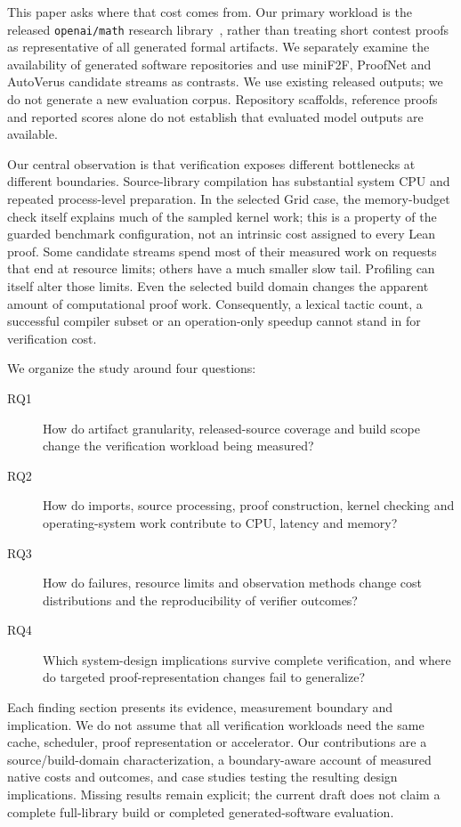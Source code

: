 \documentclass[10pt,twocolumn]{article}
\begin{document}
This paper asks where that cost comes from.
Our primary workload is the released \texttt{openai/math} research
library~\cite{openaiMathSource}, rather than treating short contest proofs as
representative of all generated formal artifacts.
We separately examine the availability of generated software repositories
and use miniF2F, ProofNet and AutoVerus candidate streams as contrasts.
We use existing released outputs; we do not generate a new evaluation corpus.
Repository scaffolds, reference proofs and reported scores alone do not
establish that evaluated model outputs are available.

Our central observation is that verification exposes different bottlenecks
at different boundaries. Source-library compilation has substantial system
CPU and repeated process-level preparation. In the selected Grid case,
the memory-budget check itself explains much of the sampled kernel work;
this is a property of the guarded benchmark configuration, not an intrinsic
cost assigned to every Lean proof. Some candidate streams spend
most of their measured work on requests that end at resource limits; others
have a much smaller slow tail. Profiling can itself alter those limits.
Even the selected build domain changes the apparent amount of computational
proof work. Consequently, a lexical tactic count, a successful compiler
subset or an operation-only speedup cannot stand in for verification cost.

We organize the study around four questions:
\begin{description}
\item[RQ1] How do artifact granularity, released-source coverage and build
scope change the verification workload being measured?
\item[RQ2] How do imports, source processing, proof construction, kernel
checking and operating-system work contribute to CPU, latency and memory?
\item[RQ3] How do failures, resource limits and observation methods change
cost distributions and the reproducibility of verifier outcomes?
\item[RQ4] Which system-design implications survive complete verification,
and where do targeted proof-representation changes fail to generalize?
\end{description}

Each finding section presents its evidence, measurement boundary and
implication. We do not assume that all verification workloads need the same
cache, scheduler, proof representation or accelerator.
Our contributions are a source/build-domain characterization, a
boundary-aware account of measured native costs and outcomes, and
case studies testing the resulting design implications.
Missing results remain explicit; the current draft does not claim a
complete full-library build or completed generated-software evaluation.
\end{document}
